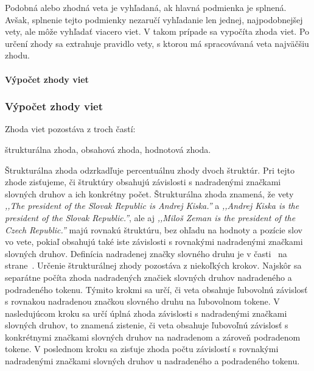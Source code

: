 Podobná alebo zhodná veta je vyhľadaná, ak hlavná podmienka je splnená. Avšak, splnenie tejto podmienky nezaručí vyhľadanie len jednej, najpodobnejšej vety, ale môže vyhľadať viacero viet. V takom prípade sa vypočíta zhoda viet. Po určení zhody sa extrahuje pravidlo vety, s ktorou má spracovávaná veta najväčšiu zhodu.

%
%
{
	\paragraph{Výpočet zhody viet}
}
{
	\subsubsection{Výpočet zhody viet}
}
\label{paragraph:sentences_match}

Zhoda viet pozostáva z troch častí:
\begin{my_itemize}
	\myitem štrukturálna zhoda,
	\myitem obsahová zhoda,
	\myitem hodnotová zhoda.
\end{my_itemize}

Štrukturálna zhoda odzrkadľuje percentuálnu zhody dvoch štruktúr. Pri tejto zhode zisťujeme, či štruktúry obsahujú závislosti s nadradenými značkami slovných druhov a ich konkrétny počet. Štrukturálna zhoda znamená, že vety \textit{,,The president of the Slovak Republic is Andrej Kiska.''} a \textit{,,Andrej Kiska is the president of the Slovak Republic.''}, ale aj \textit{,,Miloš Zeman is the president of the Czech Republic.''} majú rovnakú štruktúru, bez ohľadu na hodnoty a pozície slov vo vete, pokiaľ obsahujú také iste závislosti s rovnakými nadradenými značkami slovných druhov. Definícia nadradenej značky slovného druhu je v časti~ na strane~\pageref{paragraph:superior_pos_tag}. Určenie štrukturálnej zhody pozostáva z niekoľkých krokov. Najskôr sa separátne počíta zhoda nadradených značiek slovných druhov nadradeného a podradeného tokenu. Týmito krokmi sa určí, či veta obsahuje ľubovolnú závislosť s rovnakou nadradenou značkou slovného druhu na ľubovolnom tokene. V nasledujúcom kroku sa určí úplná zhoda závislosti s nadradenými značkami slovných druhov, to znamená zistenie, či veta obsahuje ľubovoľnú závislosť s konkrétnymi značkami slovných druhov na nadradenom a zároveň podradenom tokene. V poslednom kroku sa zisťuje zhoda počtu závislostí s rovnakými nadradenými značkami slovných druhov u nadradeného a podradeného tokenu. \\

